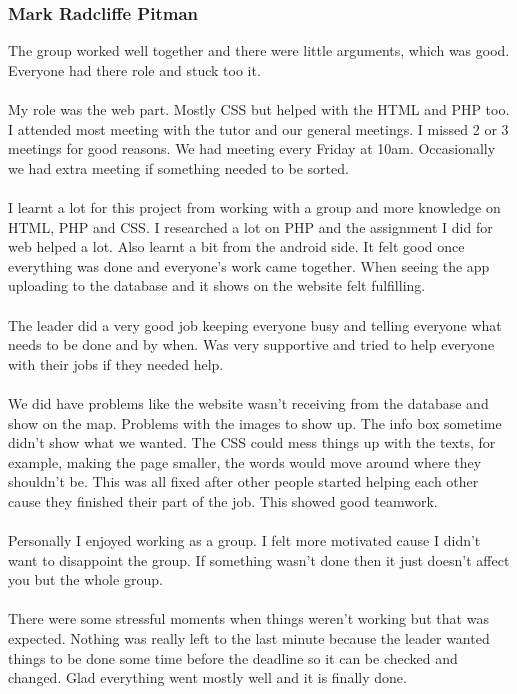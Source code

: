 \documentclass[12pt]{article}
\begin{document}
\subsubsection{Mark Radcliffe Pitman}
The group worked well together and there were little arguments, which was good. Everyone had there role and stuck too it. ~\\\\
My role was the web part. Mostly CSS but helped with the HTML and PHP too. I attended most meeting with the tutor and our general meetings. I missed 2 or 3 meetings for good reasons.  We had meeting every Friday at 10am. Occasionally we had extra meeting if something needed to be sorted. ~\\\\
I learnt a lot for this project from working with a group and more knowledge on HTML, PHP and CSS. I researched a lot on PHP and the assignment I did for web helped a lot. Also learnt a bit from the android side. It felt good once everything was done and everyone's work came together. When seeing the app uploading to the database and it shows on the website felt fulfilling.  ~\\\\
The leader did a very good job keeping everyone busy and telling everyone what needs to be done and by when. Was very supportive and tried to help everyone with their jobs if they needed help.~\\\\
We did have problems like the website wasn't receiving from the database and show on the map. Problems with the images to show up. The info box sometime didn't show what we wanted. The CSS could mess things up with the texts, for example, making the page smaller, the words would move around where they shouldn't be. This was all fixed after other people started helping each other cause they finished their part of the job. This showed good teamwork. ~\\\\
Personally I enjoyed working as a group. I felt more motivated cause I didn't want to disappoint the group. If something wasn't done then it just doesn't affect you but the whole group.~\\\\
 There were some stressful moments when things weren't working but that was expected. Nothing was really left to the last minute because the leader wanted things to be done some time before the deadline so it can be checked and changed. Glad everything went mostly well and it
is finally done.
\end{document}
